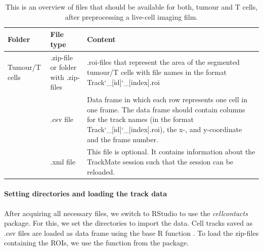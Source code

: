 \documentclass{report}
\begin{document}
\begin{table}[h!]
\centering
\caption[Data structure after preprocessing]{This is an overview of files that should be available for both, tumour and T cells, after preprocessing a live-cell imaging film.} \label{Files_after_preprocessing}

\begin{tabular}{ ll P{7cm}} 
	Folder 			& File type & Content\\ \midrule
	Tumour/T cells 	& .zip-file or folder with .zip-files	& .roi-files that represent the area of the segmented tumour/T cells with file names in the format Track\char`_[id]\char`_[index].roi \\[10pt]
					& .csv file & Data frame in which each row represents one cell in one frame.  The data frame should contain columns for the track names (in the format Track\char`_[id]\char`_[index].roi), the x-, and y-coordinate and the frame number.\\[10pt]
					& .xml file & This file is optional. It contains information about the TrackMate session such that the session can be reloaded.\\ \bottomrule
	\end{tabular}
\end{table}

\paragraph{Setting directories and loading the track data} After acquiring all necessary files, we switch to RStudio to use the \textit{cellcontacts} package. For this, we set the directories to import the data. Cell tracks saved as .csv files are loaded as data frame using the base R function .
To load the zip-files containing the ROIs, we use the  function from the  package. 
\end{document}
